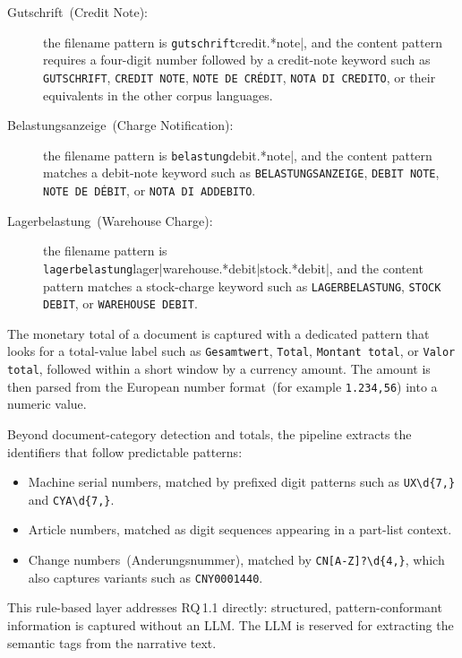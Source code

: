 \begin{description}
    \item[Gutschrift~(Credit Note):] the filename pattern is
          \verb|gutschrift|credit.*note|, and the content pattern requires a
          four-digit number followed by a credit-note keyword such as
          \texttt{GUTSCHRIFT}, \texttt{CREDIT NOTE}, \texttt{NOTE DE
          CR\'EDIT}, \texttt{NOTA DI CREDITO}, or their equivalents in the
          other corpus languages.

    \item[Belastungsanzeige~(Charge Notification):] the filename pattern is
          \verb|belastung|debit.*note|, and the content pattern matches a
          debit-note keyword such as \texttt{BELASTUNGSANZEIGE}, \texttt{DEBIT
          NOTE}, \texttt{NOTE DE D\'EBIT}, or \texttt{NOTA DI ADDEBITO}.

    \item[Lagerbelastung~(Warehouse Charge):] the filename pattern is
          \verb|lagerbelastung|lager|warehouse.*debit|stock.*debit|, and the
          content pattern matches a stock-charge keyword such as
          \texttt{LAGERBELASTUNG}, \texttt{STOCK DEBIT}, or \texttt{WAREHOUSE
          DEBIT}.
\end{description}

The monetary total of a document is captured with a dedicated pattern that
looks for a total-value label such as \texttt{Gesamtwert}, \texttt{Total},
\texttt{Montant total}, or \texttt{Valor total}, followed within a short window
by a currency amount.  The amount is then parsed from the European number
format~(for example \texttt{1.234,56}) into a numeric value.

Beyond document-category detection and totals, the pipeline extracts the
identifiers that follow predictable patterns:

\begin{itemize}
    \item Machine serial numbers, matched by prefixed digit patterns such as
          \verb|UX\d{7,}| and \verb|CYA\d{7,}|.
    \item Article numbers, matched as digit sequences appearing in a part-list
          context.
    \item Change numbers~(Anderungsnummer), matched by \verb|CN[A-Z]?\d{4,}|,
          which also captures variants such as \texttt{CNY0001440}.
\end{itemize}

This rule-based layer addresses RQ\,1.1 directly: structured, pattern-conformant
information is captured without an LLM.  The LLM is reserved for extracting
the semantic tags from the narrative text.

